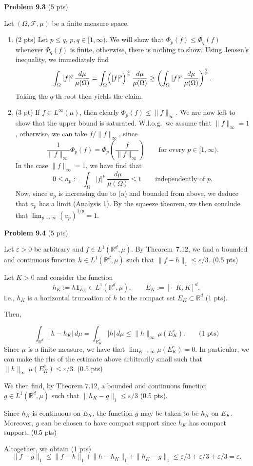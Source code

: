 \textbf{Problem 9.3} (5 pts)

Let $(\Omega,\mathcal{F},\mu)$ be a finite measure space.
\begin{enumerate}[label={(\alph*)}]
\item (2 pts) Let $p\le q$, $p,q\in[1,\infty)$. We will show that $\Phi_p(f)\le \Phi_q(f)$ whenever $\Phi_q(f)$ is finite, otherwise, there is nothing to show. Using Jensen's inequality, we immediately find
\[
	\int_\Omega |f|^q\,\frac{d\mu}{\mu(\Omega)} = \int_\Omega \Bigl(|f|^p\Bigr)^{\frac{q}{p}}\,\frac{d\mu}{\mu(\Omega)} \ge \left(\int_\Omega |f|^p\,\frac{d\mu}{\mu(\Omega)}\right)^{\frac{q}{p}}.
\]
Taking the $q$-th root then yields the claim. 

\item (3 pt) If $f\in L^\infty(\mu)$, then clearly $\Phi_p(f)\le \|f\|_\infty$. We are now left to show that the upper bound is saturated. W.l.o.g.\ we assume that $\|f\|_\infty=1$, otherwise, we can take $f/\|f\|_\infty$, since
\[
	\frac{1}{\|f\|_\infty}\Phi_p(f) = \Phi_p\left(\frac{f}{\|f\|_\infty}\right) \qquad\text{for every $p\in[1,\infty)$}.
\]
In the case $\|f\|_\infty=1$, we have find that
\[
	0\le a_p:=\int_\Omega |f|^p\,\frac{d\mu}{\mu(\Omega)} \le 1\qquad\text{independently of $p$}.
\]
Now, since $a_p$ is increasing due to (a) and bounded from above, we deduce that $a_p$ has a limit (Analysis 1). By the squeeze theorem, we then conclude that $\lim_{p\to\infty} (a_p)^{1/p} = 1$.

\end{enumerate}

\bigskip

\textbf{Problem 9.4} (5 pts)

Let $\varepsilon>0$ be arbitrary and $f\in L^1(\mathbb{R}^d,\mu)$. By Theorem~7.12, we find a bounded and continuous function $h\in L^1(\mathbb{R}^d,\mu)$ such that $\|f-h\|_1 \le \varepsilon/3$. (0.5 pts)

Let $K>0$ and consider the function 
\[
	h_K:=h\mathbf{1}_{E_K} \in L^1(\mathbb{R}^d,\mu),\qquad E_K:=[-K,K]^d,
\]
i.e., $h_K$ is a horizontal truncation of $h$ to the compact set $E_K\subset\mathbb{R}^d$ (1 pts). 

Then,

\[
	\int_{\mathbb{R}^d} |h-h_K|\,d\mu = \int_{E_K^c} |h|\,d\mu \le \|h\|_\infty\, \mu(E_K^c). \qquad \text{(1 pts)}
\]
Since $\mu$ is a finite measure, we have that $\lim_{K\to\infty} \mu(E_K^c)=0$. In particular, we can make the rhs of the estimate above arbitrarily small such that $\|h\|_\infty\, \mu(E_K^c) \le \varepsilon/3$. (0.5 pts)

We then find, by Theorem 7.12, a bounded and continuous function $g\in L^1(\mathbb{R}^d,\mu)$ such that $\|h_K-g\|_1\le \varepsilon/3$ (0.5 pts). 

Since $h_K$ is continuous on $E_K$, the function $g$ may be taken to be $h_K$ on $E_K$. Moreover, $g$ can be chosen to have compact support since $h_K$ has compact support. (0.5 pts)

Altogether, we obtain (1 pts)
\[
	\|f-g\|_1 \le \|f-h\|_1 + \|h-h_K\|_1 + \|h_K-g\|_1 \le \varepsilon/3 + \varepsilon/3 + \varepsilon/3 = \varepsilon.
\]






